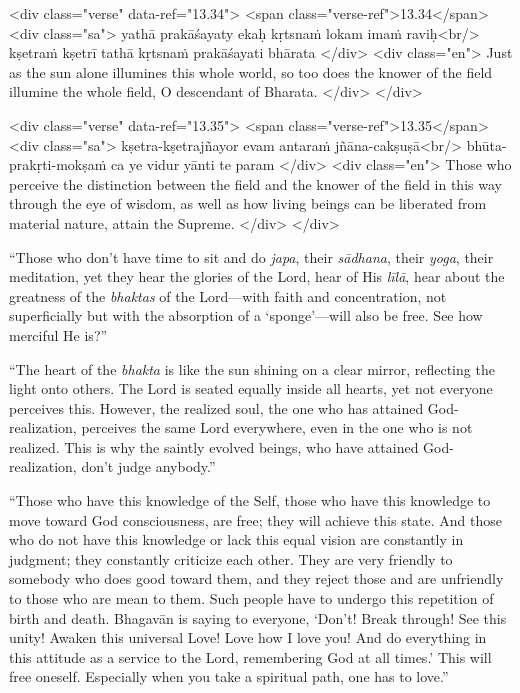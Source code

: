 \begin{html}
<div class="verse" data-ref="13.34">
  <span class="verse-ref">13.34</span>
  <div class="sa">
    yathā prakāśayaty ekaḥ kṛtsnaṁ lokam imaṁ raviḥ<br/>
    kṣetraṁ kṣetrī tathā kṛtsnaṁ prakāśayati bhārata
  </div>
  <div class="en">
    Just as the sun alone illumines this whole world, so too does the knower of the field illumine the whole field, O descendant of Bharata.
  </div>
</div>
\end{html}



\begin{html}
<div class="verse" data-ref="13.35">
  <span class="verse-ref">13.35</span>
  <div class="sa">
    kṣetra-kṣetrajñayor evam antaraṁ jñāna-cakṣuṣā<br/>
    bhūta-prakṛti-mokṣaṁ ca ye vidur yānti te param
  </div>
  <div class="en">
    Those who perceive the distinction between the field and the knower of the field in this way through the eye of wisdom, as well as how living beings can be liberated from material nature, attain the Supreme.
  </div>
</div>
\end{html}


\enquote{Those who don’t have time to sit and do \textit{japa}, their \textit{sādhana}, their \textit{yoga}, their meditation, yet they hear the glories of the Lord, hear of His \textit{līlā}, hear about the greatness of the \textit{bhaktas} of the Lord---with faith and concentration, not superficially but with the absorption of a \enquote{sponge}---will also be free. See how merciful He is?}

\enquote{The heart of the \textit{bhakta} is like the sun shining on a clear mirror, reflecting the light onto others. The Lord is seated equally inside all hearts, yet not everyone perceives this. However, the realized soul, the one who has attained God-realization, perceives the same Lord everywhere, even in the one who is not realized. This is why the saintly evolved beings, who have attained God-realization, don’t judge anybody.}

\enquote{Those who have this knowledge of the Self, those who have this knowledge to move toward God consciousness, are free; they will achieve this state. And those who do not have this knowledge or lack this equal vision are constantly in judgment; they constantly criticize each other. They are very friendly to somebody who does good toward them, and they reject those and are unfriendly to those who are mean to them. Such people have to undergo this repetition of birth and death. Bhagavān is saying to everyone, \enquote{Don’t! Break through! See this unity! Awaken this universal Love! Love how I love you! And do everything in this attitude as a service to the Lord, remembering God at all times.} This will free oneself. Especially when you take a spiritual path, one has to love.}

